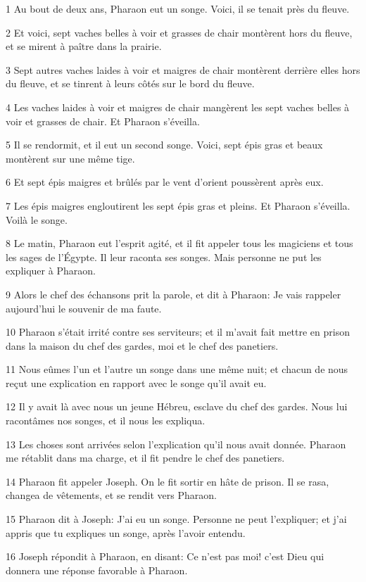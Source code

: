 \par 1 Au bout de deux ans, Pharaon eut un songe. Voici, il se tenait près du fleuve.
\par 2 Et voici, sept vaches belles à voir et grasses de chair montèrent hors du fleuve, et se mirent à paître dans la prairie.
\par 3 Sept autres vaches laides à voir et maigres de chair montèrent derrière elles hors du fleuve, et se tinrent à leurs côtés sur le bord du fleuve.
\par 4 Les vaches laides à voir et maigres de chair mangèrent les sept vaches belles à voir et grasses de chair. Et Pharaon s'éveilla.
\par 5 Il se rendormit, et il eut un second songe. Voici, sept épis gras et beaux montèrent sur une même tige.
\par 6 Et sept épis maigres et brûlés par le vent d'orient poussèrent après eux.
\par 7 Les épis maigres engloutirent les sept épis gras et pleins. Et Pharaon s'éveilla. Voilà le songe.
\par 8 Le matin, Pharaon eut l'esprit agité, et il fit appeler tous les magiciens et tous les sages de l'Égypte. Il leur raconta ses songes. Mais personne ne put les expliquer à Pharaon.
\par 9 Alors le chef des échansons prit la parole, et dit à Pharaon: Je vais rappeler aujourd'hui le souvenir de ma faute.
\par 10 Pharaon s'était irrité contre ses serviteurs; et il m'avait fait mettre en prison dans la maison du chef des gardes, moi et le chef des panetiers.
\par 11 Nous eûmes l'un et l'autre un songe dans une même nuit; et chacun de nous reçut une explication en rapport avec le songe qu'il avait eu.
\par 12 Il y avait là avec nous un jeune Hébreu, esclave du chef des gardes. Nous lui racontâmes nos songes, et il nous les expliqua.
\par 13 Les choses sont arrivées selon l'explication qu'il nous avait donnée. Pharaon me rétablit dans ma charge, et il fit pendre le chef des panetiers.
\par 14 Pharaon fit appeler Joseph. On le fit sortir en hâte de prison. Il se rasa, changea de vêtements, et se rendit vers Pharaon.
\par 15 Pharaon dit à Joseph: J'ai eu un songe. Personne ne peut l'expliquer; et j'ai appris que tu expliques un songe, après l'avoir entendu.
\par 16 Joseph répondit à Pharaon, en disant: Ce n'est pas moi! c'est Dieu qui donnera une réponse favorable à Pharaon.
